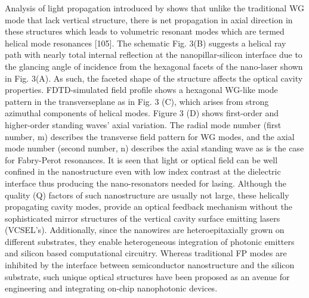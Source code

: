 Analysis of light propagation introduced by shows that unlike the traditional
WG mode that lack vertical structure, there is net propagation in axial
direction in these structures which leads to  volumetric resonant modes which
are termed helical mode resonances [105]. The schematic Fig. 3(B) suggests a
helical ray path with nearly total internal reflection at the
nanopillar-silicon interface due to the glancing angle of incidence from the
hexagonal facets of the nano-laser shown in Fig. 3(A). As such, the faceted
shape of the structure affects the optical cavity properties. FDTD-simulated
field profile shows a hexagonal WG-like mode pattern  in the transverseplane as
in Fig. 3 (C), which arises from strong azimuthal components of helical modes.
Figure 3 (D) shows first-order  and higher-order standing waves’ axial
variation. The radial mode number (first number, m) describes the transverse
field pattern for WG modes, and the axial mode number (second number, n)
describes the axial standing wave as is the case for Fabry-Perot resonances. It
is seen that light or optical field can be well confined in the nanostructure
even with low index contrast at the dielectric interface thus producing the
nano-resonators needed for lasing. Although the quality (Q) factors of such
nanostructure are usually not large, these helically propagating cavity modes,
provide an optical feedback mechanism without the sophisticated mirror
structures of the vertical cavity surface emitting lasers (VCSEL’s).
Additionally, since the nanowires are heteroepitaxially grown on different
substrates, they enable heterogeneous integration of photonic emitters and
silicon based computational circuitry.  Whereas traditional FP modes are
inhibited by the interface between semiconductor nanostructure and the silicon
substrate, such unique optical structures have been proposed as an avenue for
engineering and integrating on-chip nanophotonic devices. 

